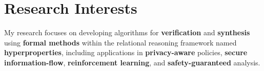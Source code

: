 

\section{Research Interests}

My research focuses on developing algorithms for 
{\bf verification} and {\bf synthesis} using {\bf formal methods} within
the relational reasoning framework named {\bf hyperproperties}, 
including applications in
{\bf privacy-aware} policies, 
{\bf secure information-flow},
{\bf reinforcement learning}, 
and {\bf safety-guaranteed} analysis.\\

